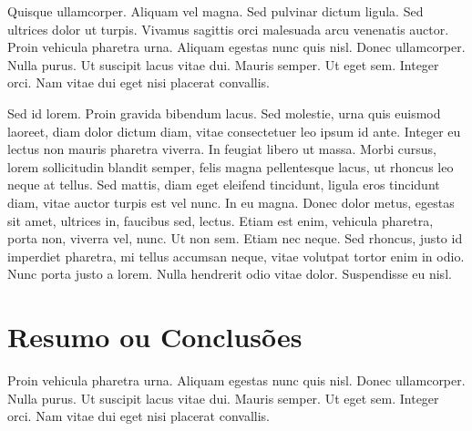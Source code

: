 Quisque ullamcorper. Aliquam vel magna. Sed pulvinar dictum
ligula. Sed ultrices dolor ut turpis. Vivamus sagittis orci malesuada
arcu venenatis auctor. Proin vehicula pharetra urna. Aliquam egestas
nunc quis nisl. Donec ullamcorper. Nulla purus. Ut suscipit lacus
vitae dui. Mauris semper. Ut eget sem. Integer orci. Nam vitae dui
eget nisi placerat convallis. 

Sed id lorem. Proin gravida bibendum lacus. Sed molestie, urna quis
euismod laoreet, diam dolor dictum diam, vitae consectetuer leo ipsum
id ante. Integer eu lectus non mauris pharetra viverra. In feugiat
libero ut massa. Morbi cursus, lorem sollicitudin blandit semper,
felis magna pellentesque lacus, ut rhoncus leo neque at tellus. Sed
mattis, diam eget eleifend tincidunt, ligula eros tincidunt diam,
vitae auctor turpis est vel nunc. In eu magna. Donec dolor metus,
egestas sit amet, ultrices in, faucibus sed, lectus. Etiam est enim,
vehicula pharetra, porta non, viverra vel, nunc. Ut non sem. Etiam nec
neque. Sed rhoncus, justo id imperdiet pharetra, mi tellus accumsan
neque, vitae volutpat tortor enim in odio. Nunc porta justo a
lorem. Nulla hendrerit odio vitae dolor. Suspendisse eu nisl.  

\section{Resumo ou Conclusões}

Proin vehicula pharetra urna. Aliquam egestas
nunc quis nisl. Donec ullamcorper. Nulla purus. Ut suscipit lacus
vitae dui. Mauris semper. Ut eget sem. Integer orci. Nam vitae dui
eget nisi placerat convallis. 
